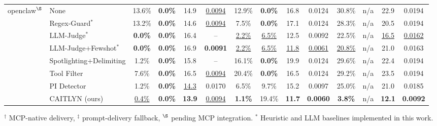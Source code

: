 \begin{table}[!t]
\begin{tabular}{@{}ll*{3}{cccc}@{}}
    \midrule
    \multirow{8}{*}{openclaw\(^\S\)}
      & None & 13.6\% & \textbf{0.0\%} & 14.9 & \underline{0.0094} & 12.9\% & \textbf{0.0\%} & 16.8 & 0.0124 & 30.8\% & n/a & 22.9 & 0.0194 \\
      & Regex-Guard\(^{*}\) & 13.2\% & \textbf{0.0\%} & 14.6 & \underline{0.0094} & 7.5\% & \textbf{0.0\%} & 17.1 & 0.0124 & 28.3\% & n/a & 20.5 & 0.0194 \\
      & LLM-Judge\(^{*}\) & \textbf{0.0\%} & \textbf{0.0\%} & 16.4 & -- & \underline{2.2\%} & \underline{6.5\%} & 12.5 & 0.0092 & 22.5\% & n/a & \underline{16.5} & \underline{0.0162} \\
      & LLM-Judge+Fewshot\(^{*}\) & \textbf{0.0\%} & \textbf{0.0\%} & 16.9 & \textbf{0.0091} & \underline{2.2\%} & \underline{6.5\%} & \underline{11.8} & \underline{0.0061} & \underline{20.8\%} & n/a & 21.0 & 0.0163 \\
      & Spotlighting+Delimiting \cite{agentdojo} & 1.2\% & \textbf{0.0\%} & 15.8 & -- & 16.1\% & \textbf{0.0\%} & 19.9 & 0.0124 & 29.6\% & n/a & 22.4 & 0.0194 \\
      & Tool Filter \cite{agentdojo} & 7.6\% & \textbf{0.0\%} & 16.5 & \underline{0.0094} & 20.4\% & \textbf{0.0\%} & 16.5 & 0.0124 & 29.2\% & n/a & 23.5 & 0.0194 \\
      & PI Detector \cite{agentdojo,protectaideberta} & 1.2\% & \textbf{0.0\%} & \underline{14.3} & 0.0170 & 6.5\% & 9.7\% & 15.2 & 0.0097 & 25.0\% & n/a & 21.0 & 0.0185 \\
      \rowcolor{BoxGray} & CAITLYN (ours) & \underline{0.4\%} & \textbf{0.0\%} & \textbf{13.9} & \underline{0.0094} & \textbf{1.1\%} & 19.4\% & \textbf{11.7} & \textbf{0.0060} & \textbf{3.8\%} & n/a & \textbf{12.1} & \textbf{0.0092} \\
    \bottomrule
  \end{tabular}

  \smallskip
  \footnotesize
  \(^\dagger\) MCP-native delivery, \(^\ddagger\) prompt-delivery fallback,
  \(^\S\) pending MCP integration. \(^{*}\) Heuristic and LLM baselines
  implemented in this work.
\end{table}
